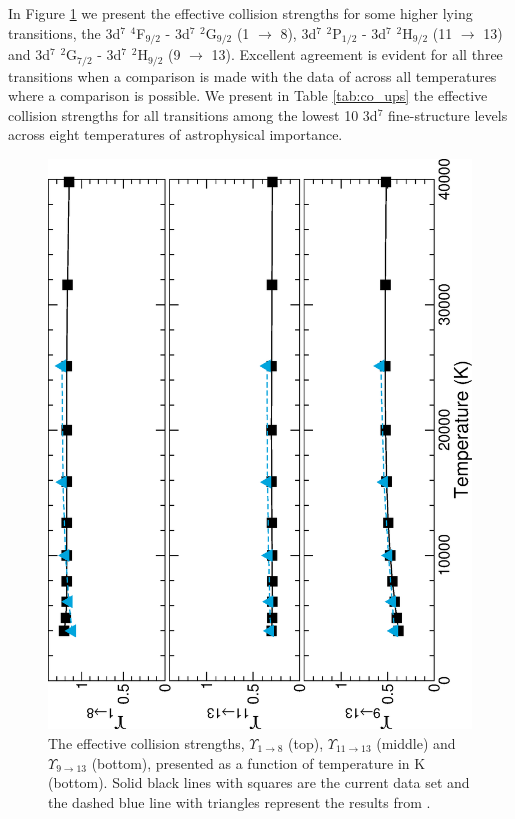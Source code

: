 In Figure \ref{fig:co_coll_5to7} we present the effective collision strengths for some higher lying transitions, the 3d$^7$ $^4$F$_{9/2}$ - 3d$^7$ $^2$G$_{9/2}$ (1 $\rightarrow$ 8), 3d$^7$ $^2$P$_{1/2}$ - 3d$^7$ $^2$H$_{9/2}$ (11 $\rightarrow$ 13) and 3d$^7$ $^2$G$_{7/2}$ - 3d$^7$ $^2$H$_{9/2}$ (9 $\rightarrow$ 13). Excellent agreement is evident for all three transitions when a comparison is made with the data of \citet{2016MNRAS.tmp..556S} across all temperatures where a comparison is possible. We present in Table \ref{tab:co_ups} the effective collision strengths for all transitions among the lowest 10 3d$^7$ fine-structure levels across eight temperatures of astrophysical importance.

%
\begin{figure}
\centering
\includegraphics[scale=0.53, angle=-90]{Figures/Cobalt/electron/trans5-7.eps}
\caption{The effective collision strengths, $\Upsilon_{1\rightarrow 8}$ (top), $\Upsilon_{11\rightarrow 13}$ (middle) and $\Upsilon_{9\rightarrow 13}$ (bottom), presented as a function of temperature in K (bottom). Solid black lines with squares are the current data set and the dashed blue line with triangles represent the results from \citep{2016MNRAS.tmp..556S}. \label{fig:co_coll_5to7}}
\end{figure}
%

